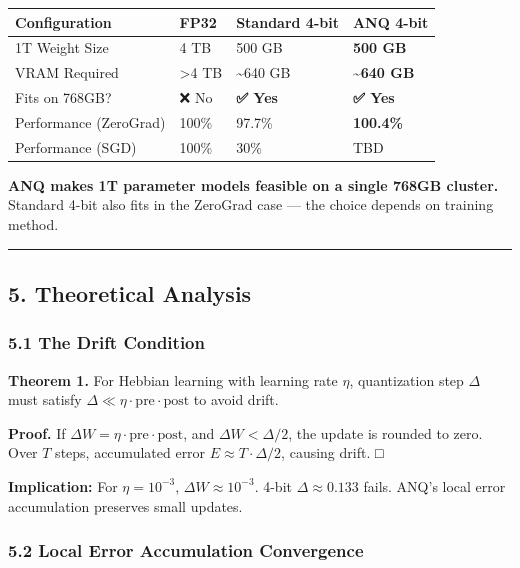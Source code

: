\documentclass[
  11pt,
  a4paper,
]{article}
\begin{document}
\begin{longtable}[]{@{}llll@{}}
\toprule\noalign{}
Configuration & FP32 & Standard 4-bit & \textbf{ANQ 4-bit} \\
\midrule\noalign{}
\endhead
\bottomrule\noalign{}
\endlastfoot
1T Weight Size & 4 TB & 500 GB & \textbf{500 GB} \\
VRAM Required & \textgreater4 TB & \textasciitilde640 GB &
\textbf{\textasciitilde640 GB} \\
Fits on 768GB? & ❌ No & \textbf{✅ Yes} & \textbf{✅ Yes} \\
Performance (ZeroGrad) & 100\% & 97.7\% & \textbf{100.4\%} \\
Performance (SGD) & 100\% & 30\% & TBD \\
\end{longtable}

\textbf{ANQ makes 1T parameter models feasible on a single 768GB
cluster.} Standard 4-bit also fits in the ZeroGrad case --- the choice
depends on training method.

\begin{center}\rule{0.5\linewidth}{0.5pt}\end{center}

\subsection{5. Theoretical Analysis}\label{theoretical-analysis}

\subsubsection{5.1 The Drift Condition}\label{the-drift-condition}

\textbf{Theorem 1.} For Hebbian learning with learning rate \(\eta\),
quantization step \(\Delta\) must satisfy
\(\Delta \ll \eta \cdot \text{pre} \cdot \text{post}\) to avoid drift.

\textbf{Proof.} If
\(\Delta W = \eta \cdot \text{pre} \cdot \text{post}\), and
\(\Delta W < \Delta/2\), the update is rounded to zero. Over \(T\)
steps, accumulated error \(E \approx T \cdot \Delta/2\), causing drift.
□

\textbf{Implication:} For \(\eta = 10^{-3}\),
\(\Delta W \approx 10^{-3}\). 4-bit \(\Delta \approx 0.133\) fails.
ANQ's local error accumulation preserves small updates.

\subsubsection{5.2 Local Error Accumulation
Convergence}\label{local-error-accumulation-convergence}
\end{document}
